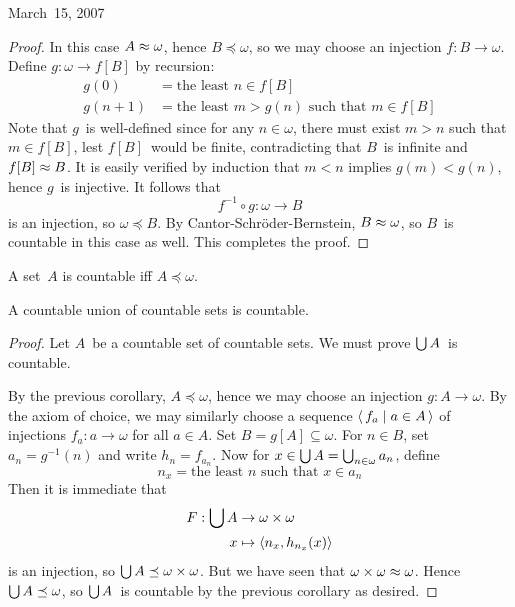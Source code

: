 \begin{lecture}{March~15, 2007}
\begin{proof}
In this case \(A\approx\omega\), hence \(B\preceq\omega\), so we may choose an injection \(f:B\to\omega\). Define \(g:\omega\to f[B]\) by recursion:
\begin{align*}
g(0)&=\text{the least }n\in f[B]\\
g(n+1)&=\text{the least }m>g(n)\text{ such that }m\in f[B]
\end{align*}
Note that \(g\)~is well-defined since for any \(n\in\omega\), there must exist \(m>n\) such that \(m\in f[B]\), lest \(f[B]\)~would be finite, contradicting that \(B\)~is infinite and \(f[B]\approx B\). It is easily verified by induction that \(m<n\) implies \(g(m)<g(n)\), hence \(g\)~is injective. It follows that
\[f^{-1}\circ g:\omega\to B\]
is an injection, so \(\omega\preceq B\). By Cantor-Schr\"oder-Bernstein, \(B\approx\omega\), so \(B\)~is countable in this case as well. This completes the proof.
\end{proof}
\begin{cor}
A set~\(A\) is countable iff \(A\preceq\omega\).
\end{cor}
\begin{thm}
A countable union of countable sets is countable.
\end{thm}
\begin{proof}
Let \(A\)~be a countable set of countable sets. We must prove \(\bigcup A\)~is countable.

By the previous corollary, \(A\preceq\omega\), hence we may choose an injection \(g:A\to\omega\). By the axiom of choice, we may similarly choose a sequence \(\langle\,{f_a}\mid{a\in A}\,\rangle\) of injections \(f_a:a\to\omega\) for all \(a\in A\). Set \(B=g[A]\subseteq\omega\). For \(n\in B\), set \(a_n=g^{-1}(n)\) and write \(h_n=f_{a_n}\). Now for \(x\in\bigcup A=\bigcup_{n\in\omega} a_n\), define
\[n_x=\text{the least }n\text{ such that }x\in a_n\]
Then it is immediate that
\begin{align*}
F:\bigcup A&\to\omega\times\omega\\
	x&\mapsto\langle{n_x},{h_{n_x}(x)}\rangle
\end{align*}
is an injection, so \(\bigcup A\preceq\omega\times\omega\). But we have seen that \(\omega\times\omega\approx\omega\). Hence \(\bigcup A\preceq\omega\), so \(\bigcup A\)~is countable by the previous corollary as desired.
\end{proof}


\end{lecture}
